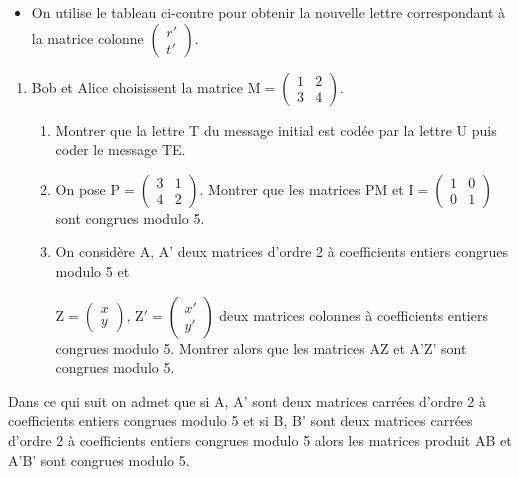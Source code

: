 \documentclass[10pt]{article}
\begin{document}
\begin{itemize}
		\item On utilise le tableau ci-contre pour obtenir la nouvelle lettre correspondant à la matrice colonne $\begin{pmatrix} r'\\t' \end{pmatrix}$.
\end{itemize}

\begin{enumerate}
	\item Bob et Alice choisissent la matrice $\text{M} = \begin{pmatrix} 1&2\\3&4 \end{pmatrix}$.	
	\begin{enumerate}
		\item Montrer que la lettre \og{}\textsf{T}\fg{} du message initial est codée par la lettre \og{}\textsf{U}\fg{} puis coder le message \og{}\textsf{TE}\fg{}.		
		\item On pose $\text{P} = \begin{pmatrix} 3&1\\4&2 \end{pmatrix}$. Montrer que les matrices PM et $\text{I} = \begin{pmatrix} 1&0\\0&1 \end{pmatrix}$ sont congrues modulo 5.		
		\item On considère A, A' deux matrices d'ordre 2 à coefficients entiers congrues modulo 5 et 
		
$\text{Z} =\begin{pmatrix} x\\y \end{pmatrix}$, $\text{Z}' =\begin{pmatrix} x'\\y' \end{pmatrix}$ deux matrices colonnes à coefficients entiers congrues modulo 5. Montrer alors que les matrices AZ et A'Z' sont congrues modulo 5.
	\end{enumerate}
\end{enumerate}

\bigskip

Dans ce qui suit on admet que si A, A' sont deux matrices carrées d'ordre 2 à coefficients entiers congrues modulo 5 et si B, B' sont deux matrices carrées d'ordre 2 à coefficients entiers congrues modulo 5 alors les matrices produit AB et A'B' sont congrues modulo 5.
\end{document}
